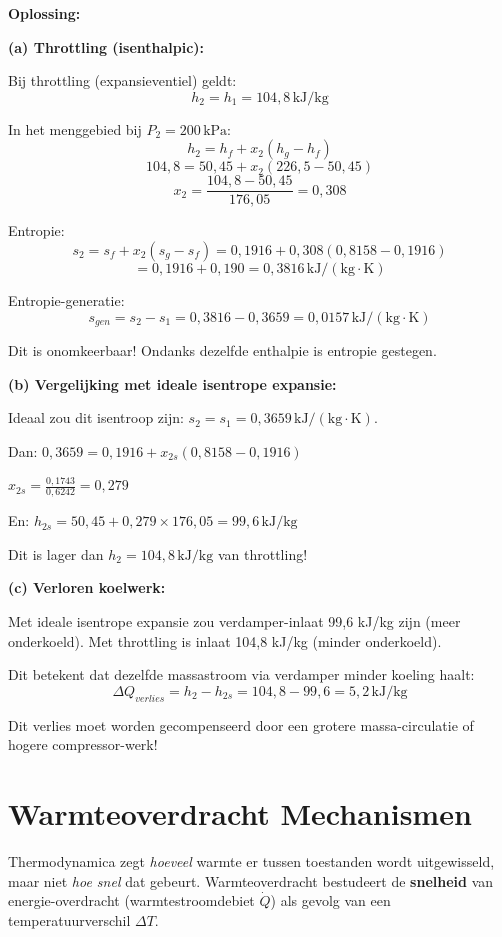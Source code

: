 \documentclass[a4paper,11pt,twoside]{report}
\begin{document}
\textbf{Oplossing:}

\textbf{(a) Throttling (isenthalpic):}

Bij throttling (expansieventiel) geldt:
\[
h_2 = h_1 = 104,8\,\mathrm{kJ/kg}
\]

In het menggebied bij $P_2 = 200\,\mathrm{kPa}$:
\[
h_2 = h_f + x_2(h_g - h_f)
\]
\[
104,8 = 50,45 + x_2(226,5 - 50,45)
\]
\[
x_2 = \frac{104,8 - 50,45}{176,05} = 0,308
\]

Entropie:
\[
s_2 = s_f + x_2(s_g - s_f) = 0,1916 + 0,308(0,8158 - 0,1916)
\]
\[
= 0,1916 + 0,190 = 0,3816\,\mathrm{kJ/(kg \cdot K)}
\]

Entropie-generatie:
\[
s_{gen} = s_2 - s_1 = 0,3816 - 0,3659 = 0,0157\,\mathrm{kJ/(kg \cdot K)}
\]

Dit is onomkeerbaar! Ondanks dezelfde enthalpie is entropie gestegen.

\textbf{(b) Vergelijking met ideale isentrope expansie:}

Ideaal zou dit isentroop zijn: $s_2 = s_1 = 0,3659\,\mathrm{kJ/(kg \cdot K)}$.

Dan: $0,3659 = 0,1916 + x_{2s}(0,8158 - 0,1916)$

$x_{2s} = \frac{0,1743}{0,6242} = 0,279$

En: $h_{2s} = 50,45 + 0,279 \times 176,05 = 99,6\,\mathrm{kJ/kg}$

Dit is lager dan $h_2 = 104,8\,\mathrm{kJ/kg}$ van throttling!

\textbf{(c) Verloren koelwerk:}

Met ideale isentrope expansie zou verdamper-inlaat 99,6 kJ/kg zijn (meer onderkoeld).
Met throttling is inlaat 104,8 kJ/kg (minder onderkoeld).

Dit betekent dat dezelfde massastroom via verdamper minder koeling haalt:
\[
\Delta Q_{verlies} = h_2 - h_{2s} = 104,8 - 99,6 = 5,2\,\mathrm{kJ/kg}
\]

Dit verlies moet worden gecompenseerd door een grotere massa-circulatie of hogere compressor-werk!

\chapter{Warmteoverdracht Mechanismen}
Thermodynamica zegt \textit{hoeveel} warmte er tussen toestanden wordt uitgewisseld,
 maar niet \textit{hoe snel} dat gebeurt.
  Warmteoverdracht bestudeert de \textbf{snelheid} van energie-overdracht (warmtestroomdebiet $\dot{Q}$)
   als gevolg van een temperatuurverschil $\Delta T$.
\end{document}
